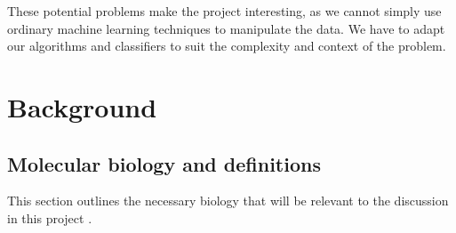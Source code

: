 \documentclass[12pt, twoside, a4paper]{report}
\begin{document}
These potential problems make the project interesting, as we cannot simply use ordinary machine learning techniques to manipulate the data. We have to adapt our algorithms and classifiers to suit the complexity and context of the problem.

\chapter{Background}






\section{Molecular biology and definitions} \label{bg:bio}
This section outlines the necessary biology that will be relevant to the discussion in this project \cite{RefWorks:106, RefWorks:108, RefWorks:110, RefWorks:111}.
\end{document}
